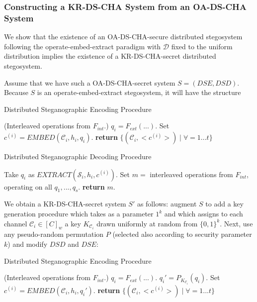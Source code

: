 \documentclass{article}
\begin{document}
\subsubsection{Constructing a KR-DS-CHA System from an OA-DS-CHA System}

We show that the existence of an OA-DS-CHA-secure distributed stegosystem following the 
operate-embed-extract paradigm with $\mathcal{D}$ fixed to the uniform distribution implies the existence 
of a KR-DS-CHA-secret distributed stegosystem.

Assume that we have such a OA-DS-CHA-secret system $S=(DSE,DSD)$.  Because $S$ is an operate-embed-extract 
stegosystem, it will have the structure 

\begin{algorithm}[H]
\caption{Distributed Steganographic Encoding Procedure}\label{1a}
\begin{algorithmic}[1]
\State (Interleaved operations from $F_{int}$.)
\State $q_i = F_{ext}(...)$.
\State Set $c^{(i)} = EMBED(\mathcal{C}_i, h_i, q_i)$.
\EndFor
\State \textbf{return} $\{(\mathcal{C}_i, <c^{(i)}>) \mid \forall =1...t \}$
\EndProcedure
\end{algorithmic}
\end{algorithm}

\begin{algorithm}[H]
\caption{Distributed Steganographic Decoding Procedure}\label{1a}
\begin{algorithmic}[1]
\State Take $q_i$ as $EXTRACT(\mathcal{S}_i, h_i, c^{(i)})$.
\EndFor
\State Set $m = $ interleaved operations from $F_{int}$, operating on all $q_1,...,q_s$. 
\State \textbf{return} $m$.
\EndProcedure
\end{algorithmic}
\end{algorithm}

We obtain a KR-DS-CHA-secret system $S'$ as follows: augment $S$ to add a key generation procedure 
which takes as a parameter $1^k$ and which assigns to each channel $\mathcal{C}_i \in [C]_w$ a key $K_{\mathcal{C}_i}$ drawn 
uniformly at random from $\{0,1\}^k$.  Next, use any pseudo-random permutation $P$ (selected also according to 
security parameter $k$) and modify $DSD$ and $DSE$:

\begin{algorithm}[H]
\caption{Distributed Steganographic Encoding Procedure}\label{1a}
\begin{algorithmic}[1]
\State (Interleaved operations from $F_{int}$.)
\State $q_i = F_{ext}(...)$.
\State $q_i' = P_{K_{\mathcal{C}_i}}(q_i)$.
\State Set $c^{(i)} = EMBED(\mathcal{C}_i, h_i, q_i')$.
\EndFor
\State \textbf{return} $\{(\mathcal{C}_i, <c^{(i)}>) \mid \forall =1...t \}$
\EndProcedure
\end{algorithmic}
\end{algorithm}
\end{document}
